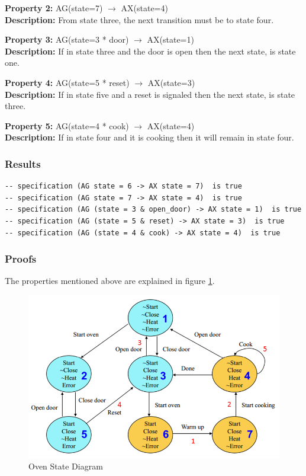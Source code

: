 \documentclass[11pt]{article}
\begin{document}
		\textbf{Property 2:} AG(state=7) $\to$ AX(state=4)\\ 
		\textbf{Description:} From state three, the next transition must be to state four. \\
		\vspace{12pt}
		
		\textbf{Property 3:} 	AG(state=3 * door) $\to$ AX(state=1)\\ 
		\textbf{Description:} If in state three and the door is open then the next state, is state one. \\
		\vspace{12pt}
		
		\textbf{Property 4:} AG(state=5 * reset) $\to$ AX(state=3) \\
		\textbf{Description:} If in state five and a reset is signaled then the next state, is state three.\\
		\vspace{12pt}
		
		\textbf{Property 5:} AG(state=4 * cook) $\to$ AX(state=4)  \\
		\textbf{Description:} If in state four and it is cooking then it will remain in state four.\\
		
		
	
	\subsubsection{Results}
		\begin{lstlisting}[caption=NuSMV Kripke Diagram Output, label=p2_2_out]	
-- specification (AG state = 6 -> AX state = 7)  is true
-- specification (AG state = 7 -> AX state = 4)  is true
-- specification (AG (state = 3 & open_door) -> AX state = 1)  is true
-- specification (AG (state = 5 & reset) -> AX state = 3)  is true
-- specification (AG (state = 4 & cook) -> AX state = 4)  is true
		\end{lstlisting}
	
	
	\subsubsection{Proofs}
	The properties mentioned above are explained in figure \ref{p2_2_p}.
	\begin{figure}[h]\centering
	\includegraphics[height=0.45\textwidth]{images/p2_2_proof.png}
		\caption{Oven State Diagram}
			\label{p2_2_p}
		\end{figure}
\end{document}
